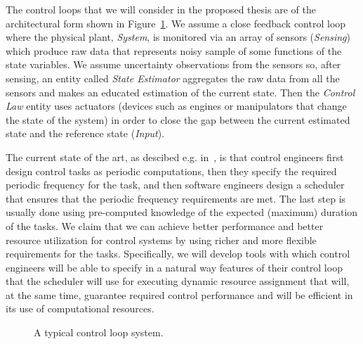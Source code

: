 \documentclass[11pt]{article}
\begin{document}
The control loops that we will consider in the proposed thesis are of the architectural form shown in Figure~\ref{fig:control loop}. 
We assume a close feedback control loop where the physical plant, \textit{System}, is monitored via an array of sensors (\textit{Sensing}) which produce raw data that represents noisy sample of some functions of the state variables. 
We assume uncertainty observations from the sensors so, after sensing, an entity called \textit{State Estimator} aggregates the raw data from all the sensors and makes an educated estimation of the current state. Then the \textit{Control Law} entity uses  actuators (devices such as engines or manipulators that change the state of the system) in order to close the gap between the current estimated state and the reference state (\textit{Input}).

The current state of the art, as descibed e.g. in~\cite{Celvin}, is that control engineers first design control tasks as periodic computations, then they specify the required periodic frequency for the task, and then software engineers design a scheduler that ensures that the periodic frequency requirements are met. The last step is usually done using pre-computed knowledge of the expected (maximum) duration of the tasks.
We claim that we can achieve better performance and better resource utilization for control systems by using richer and more flexible requirements for the tasks. Specifically, we will develop tools with which control engineers will be able to specify in a natural way features of their control loop that the scheduler will use for executing dynamic resource assignment that will, at the same time, guarantee required control performance and will be efficient in its use of computational resources. 

\begin{figure}[]
    \centering
    
    
    \caption{A typical control loop system.
    \label{fig:control loop}}
\end{figure}
\end{document}
